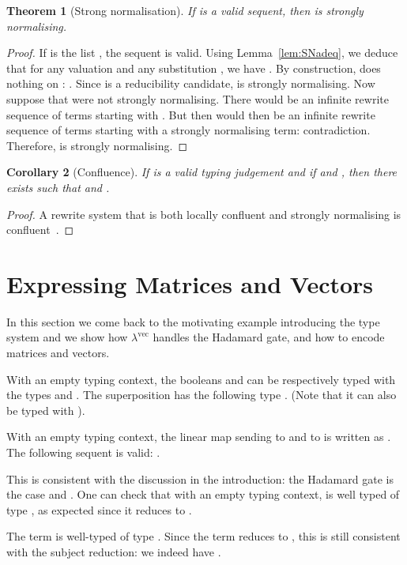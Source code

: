 \documentclass[colorlinks=true,linkcolor=black,urlcolor=black,citecolor=blue,submission,copyright,creativecommons]{eptcs}
\newtheorem{theorem}{Theorem}[section]
\newtheorem{corollary}[theorem]{Corollary}
\newcommand{\lvec}{\ensuremath{\lambda^{\!\!\textrm{vec}}}}
\begin{document}
\begin{theorem}[Strong normalisation]\label{th:SN}
  If  is a valid sequent, then  is strongly normalising.
\end{theorem}
\begin{proof}
  If  is the list , the sequent  is valid. Using Lemma~\ref{lem:SNadeq}, we deduce that for any valuation  and any substitution , we have . By construction,  does nothing on : . Since  is a reducibility candidate,  is strongly normalising. Now suppose that  were not strongly normalising. There would be an infinite rewrite sequence of terms   starting with . But then  would then be an infinite rewrite sequence of terms starting with a strongly normalising term: contradiction. Therefore,  is strongly normalising.
\end{proof}

 
  
\begin{corollary}[Confluence]
  If  is a valid typing judgement and if
   and , then there exists 
  such that  and .
\end{corollary}
\begin{proof}
  A rewrite system that is both locally confluent and strongly
  normalising is confluent~\cite{terese03}.
\end{proof}

\section{Expressing Matrices and Vectors}\label{sec:examples}

In this section we come back to the motivating example introducing the
type system and we show how {\lvec} handles the Hadamard gate, and how
to encode matrices and vectors.

With an empty typing context, the booleans 
 and 
can be respectively typed with the types 
 and .
The superposition has the following type . (Note that it can also be typed with ).

With an empty typing context, the linear map  sending 
to  and  to
 is written as
.
The following sequent is valid: 
.

This is consistent with the discussion in the introduction:
the Hadamard gate is the case  and
.  One can check that with an empty typing context,
 is well typed of type
, as expected since it reduces to
.

The term  is
well-typed of type . Since the term reduces to
, this is still consistent with the subject reduction: we
indeed have
.
\end{document}
